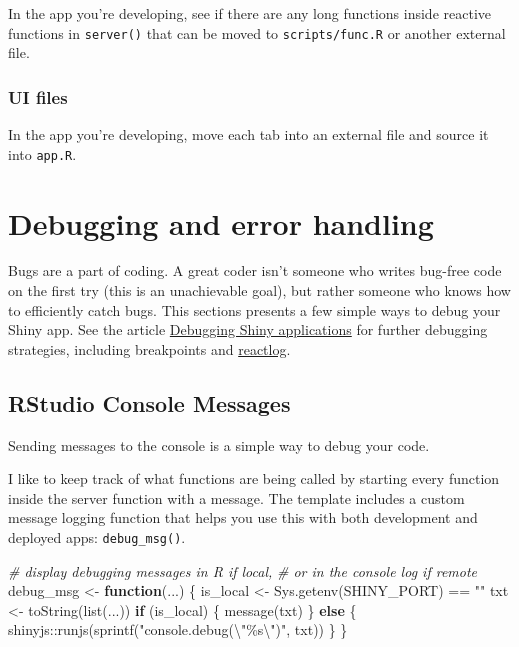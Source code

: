 \documentclass[
]{book}
\newenvironment{Shaded}{\begin{snugshade}}{\end{snugshade}}
\newcommand{\CommentTok}[1]{\textcolor[rgb]{0.56,0.35,0.01}{\textit{#1}}}
\newcommand{\ControlFlowTok}[1]{\textcolor[rgb]{0.13,0.29,0.53}{\textbf{#1}}}
\newcommand{\FunctionTok}[1]{\textcolor[rgb]{0.00,0.00,0.00}{#1}}
\newcommand{\NormalTok}[1]{#1}
\newcommand{\OtherTok}[1]{\textcolor[rgb]{0.56,0.35,0.01}{#1}}
\newcommand{\SpecialCharTok}[1]{\textcolor[rgb]{0.00,0.00,0.00}{#1}}
\newcommand{\StringTok}[1]{\textcolor[rgb]{0.31,0.60,0.02}{#1}}
\begin{document}
In the app you're developing, see if there are any long functions inside reactive functions in \texttt{server()} that can be moved to \texttt{scripts/func.R} or another external file.

\hypertarget{ui-files}{%
\subsection{UI files}\label{ui-files}}

In the app you're developing, move each tab into an external file and source it into \texttt{app.R}.

\hypertarget{debugging}{%
\chapter{Debugging and error handling}\label{debugging}}

Bugs are a part of coding. A great coder isn't someone who writes bug-free code on the first try (this is an unachievable goal), but rather someone who knows how to efficiently catch bugs. This sections presents a few simple ways to debug your Shiny app. See the article \href{https://shiny.rstudio.com/articles/debugging.html}{Debugging Shiny applications} for further debugging strategies, including breakpoints and \href{https://rstudio.github.io/reactlog/}{reactlog}.

\hypertarget{rstudio-console-messages}{%
\section{RStudio Console Messages}\label{rstudio-console-messages}}

Sending messages to the console is a simple way to debug your code.

I like to keep track of what functions are being called by starting every function inside the server function with a message. The template includes a custom message logging function that helps you use this with both development and deployed apps: \texttt{debug\_msg()}.

\begin{Shaded}
\begin{Highlighting}[]
\CommentTok{\# display debugging messages in R if local, }
\CommentTok{\# or in the console log if remote}
\NormalTok{debug\_msg }\OtherTok{\textless{}{-}} \ControlFlowTok{function}\NormalTok{(...) \{}
\NormalTok{  is\_local }\OtherTok{\textless{}{-}} \FunctionTok{Sys.getenv}\NormalTok{(}\StringTok{\textquotesingle{}SHINY\_PORT\textquotesingle{}}\NormalTok{) }\SpecialCharTok{==} \StringTok{""}
\NormalTok{  txt }\OtherTok{\textless{}{-}} \FunctionTok{toString}\NormalTok{(}\FunctionTok{list}\NormalTok{(...))}
  \ControlFlowTok{if}\NormalTok{ (is\_local) \{}
    \FunctionTok{message}\NormalTok{(txt)}
\NormalTok{  \} }\ControlFlowTok{else}\NormalTok{ \{}
\NormalTok{    shinyjs}\SpecialCharTok{::}\FunctionTok{runjs}\NormalTok{(}\FunctionTok{sprintf}\NormalTok{(}\StringTok{"console.debug(}\SpecialCharTok{\textbackslash{}"}\StringTok{\%s}\SpecialCharTok{\textbackslash{}"}\StringTok{)"}\NormalTok{, txt))}
\NormalTok{  \}}
\NormalTok{\}}
\end{Highlighting}
\end{Shaded}
\end{document}
